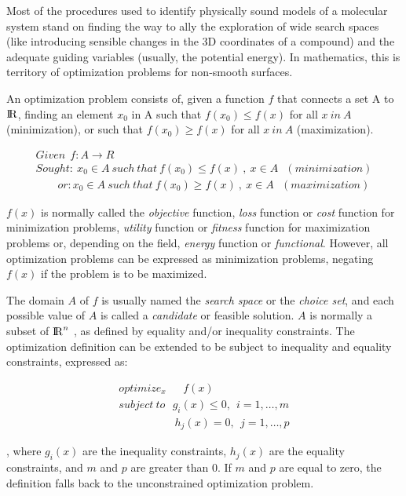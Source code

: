 Most of the procedures used to identify physically sound models of a molecular system stand on finding the way to ally the exploration of wide search spaces (like introducing sensible changes in the 3D coordinates of a compound) and the adequate guiding variables (usually, the potential energy). In mathematics, this is territory of optimization problems for non-smooth surfaces.

An optimization problem consists of, given a function $ f $ that connects a set A to ${\rm I\!R}$, finding an element $ x_{0} $ in A such that $ f(x_{0}) \leq f(x) $ for all $ x~in~A $  (minimization), or such that $ f(x_{0}) \geq f(x) $ for all $ x~in~A $ (maximization).

\begin{align}
	Given ~~ f:A \rightarrow R \nonumber \\
	Sought: ~ x_{0} \in A ~ such ~ that ~ f(x_{0})  \leq f(x) ~,~x \in A ~~~ ( minimization ) \nonumber \\
	~~~~~~~~~ or: x_{0} \in A ~ such ~ that ~ f(x_{0})  \geq f(x) ~,~x \in A ~~~ ( maximization )
\end{align}

$ f(x) $  is normally called the \textit{objective} function, \textit{loss} function or \textit{cost} function for minimization problems, \textit{utility} function or \textit{fitness} function for maximization problems or, depending on the field, \textit{energy} function or \textit{functional}. However, all optimization problems can be expressed as minimization problems, negating  $ f(x) $  if the problem is to be maximized.

The domain  $ A $ of $ f $ is usually named the \textit{search space} or the \textit{choice set}, and each possible value of  $ A $  is called a \textit{candidate} or feasible solution.  $ A $  is normally a subset of ${\rm I\!R}^{n} $ , as defined by equality and/or inequality constraints. The optimization definition can be extended to be subject to inequality and equality constraints, expressed as:

\begin{align}
	optimize_{x}~~~~~~~ f(x) \nonumber \\
	subject~to~~~  g_{i}(x)  \leq 0,~~ i=1,  \ldots ,m \nonumber \\
	~~~~~~~~~~~~~~~~~~~~~~~ h_{j}(x) =0,~~ j=1,  \ldots ,p
\end{align}

, where  \( g_{i}(x)  \)  are the inequality constraints,  \( h_{j}(x)  \)  are the equality constraints, and  \( m \)  and  \( p \)  are greater than 0. If  \( m \)  and  \( p \)  are equal to zero, the definition falls back to the unconstrained optimization problem.

